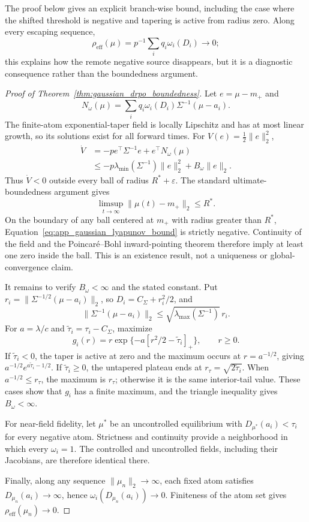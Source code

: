 \documentclass{article}
\theoremstyle{plain}
\theoremstyle{definition}
\theoremstyle{remark}
\begin{document}
The proof below gives an explicit
branch-wise bound, including the case where the shifted threshold is
negative and tapering is active from radius zero. Along every escaping
sequence,
\[
\rho_{\mathrm{eff}}(\mu)
=
p^{-1}\sum_i q_i\omega_i(D_i)
\longrightarrow 0;
\]
this explains how the remote negative source disappears, but it is a
diagnostic consequence rather than the boundedness argument.

\begin{proof}[Proof of Theorem~\ref{thm:gaussian_drpo_boundedness}]
Let \(e=\mu-m_+\) and
\[
N_\omega(\mu)=\sum_iq_i\omega_i(D_i)
\Sigma^{-1}(\mu-a_i).
\]
The finite-atom exponential-taper field is locally Lipschitz and has at
most linear growth, so its solutions exist for all forward times.
For \(V(e)=\frac12\|e\|_2^2\),
\begin{align}
\dot V
&=-p e^\top\Sigma^{-1}e+e^\top N_\omega(\mu) \\
&\le-p\lambda_{\min}(\Sigma^{-1})\|e\|_2^2
+B_\omega\|e\|_2.
\label{eq:app_gaussian_lyapunov_bound}
\end{align}
Thus \(\dot V<0\) outside every ball of radius
\(R^*+\varepsilon\). The standard ultimate-boundedness argument gives
\[
\limsup_{t\to\infty}\|\mu(t)-m_+\|_2\le R^*.
\]
On the boundary of any ball centered at \(m_+\) with radius greater
than \(R^*\), Equation~\eqref{eq:app_gaussian_lyapunov_bound} is
strictly negative. Continuity of the field and the Poincar\'e--Bohl
inward-pointing theorem therefore imply at least one zero inside the
ball. This is an existence result, not a uniqueness or global-convergence
claim.

It remains to verify \(B_\omega<\infty\) and the stated constant. Put
\(r_i=\|\Sigma^{-1/2}(\mu-a_i)\|_2\), so
\(D_i=C_\Sigma+r_i^2/2\), and
\[
\|\Sigma^{-1}(\mu-a_i)\|_2
\le\sqrt{\lambda_{\max}(\Sigma^{-1})}\,r_i.
\]
For \(a=\lambda/c\) and
\(\widetilde\tau_i=\tau_i-C_\Sigma\), maximize
\[
g_i(r)=r\exp\{-a[r^2/2-\widetilde\tau_i]_+\},\qquad r\ge0.
\]
If \(\widetilde\tau_i<0\), the taper is active at zero and the maximum
occurs at \(r=a^{-1/2}\), giving
\(a^{-1/2}e^{a\widetilde\tau_i-1/2}\). If
\(\widetilde\tau_i\ge0\), the untapered plateau ends at
\(r_\tau=\sqrt{2\widetilde\tau_i}\). When
\(a^{-1/2}\le r_\tau\), the maximum is \(r_\tau\); otherwise it is the
same interior-tail value. These cases show that \(g_i\) has a finite
maximum, and the triangle inequality gives \(B_\omega<\infty\).

For near-field fidelity, let \(\mu^*\) be an uncontrolled equilibrium
with \(D_{\mu^*}(a_i)<\tau_i\) for every negative atom. Strictness and
continuity provide a neighborhood in which every \(\omega_i=1\).
The controlled and uncontrolled fields, including their Jacobians, are
therefore identical there.

Finally, along any sequence \(\|\mu_n\|_2\to\infty\), each fixed atom
satisfies \(D_{\mu_n}(a_i)\to\infty\), hence
\(\omega_i(D_{\mu_n}(a_i))\to0\). Finiteness of the atom set gives
\(\rho_{\mathrm{eff}}(\mu_n)\to0\).
\end{proof}
\end{document}
